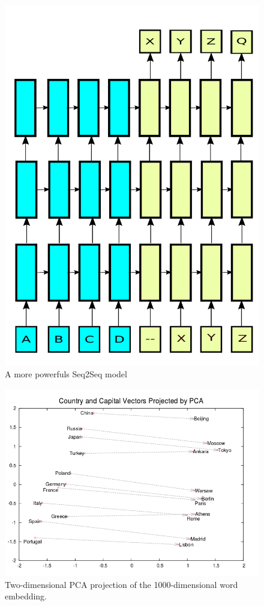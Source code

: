 \documentclass[a4paper]{article}
\begin{document}
\begin{figure}
  \centering
  \includegraphics[width=.49\linewidth]{img/seq2seq_deep.pdf}
  \caption{A more powerfuls Seq2Seq model}
  \label{fig:seqdeep}
\end{figure}


\begin{figure}
  \centering
  \includegraphics[width=.9\linewidth]{img/wordvec.png}
  \caption{
    Two-dimensional PCA projection of the 1000-dimensional word embedding.
  }
  \label{fig:wordvec}
\end{figure}
\end{document}
